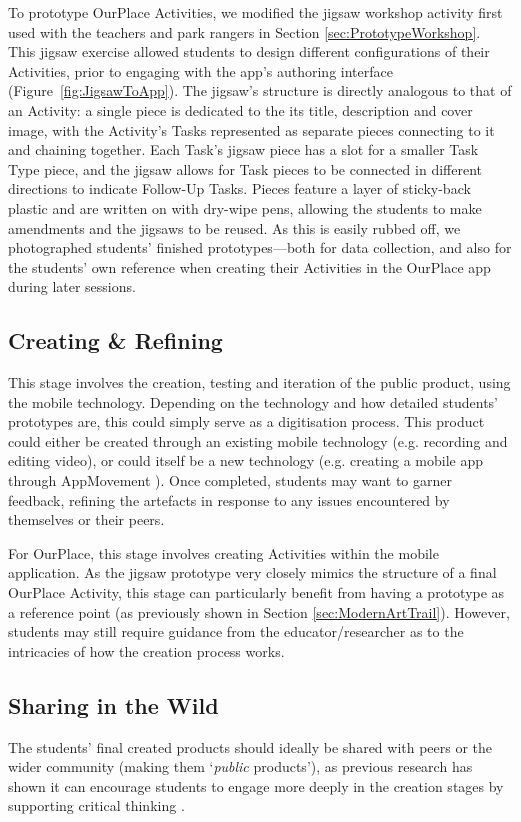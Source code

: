 To prototype OurPlace Activities, we modified the jigsaw workshop activity first used with the teachers and park rangers in Section \ref{sec:PrototypeWorkshop}. This jigsaw exercise allowed students to design different configurations of their Activities, prior to engaging with the app's authoring interface (Figure~\ref{fig:JigsawToApp}). The jigsaw's structure is directly analogous to that of an Activity: a single piece is dedicated to the its title, description and cover image, with the Activity's Tasks represented as separate pieces connecting to it and chaining together. Each Task's jigsaw piece has a slot for a smaller Task Type piece, and the jigsaw allows for Task pieces to be connected in different directions to indicate Follow-Up Tasks. Pieces feature a layer of sticky-back plastic and are written on with dry-wipe pens, allowing the students to make amendments and the jigsaws to be reused. As this is easily rubbed off, we photographed students' finished prototypes---both for data collection, and also for the students' own reference when creating their Activities in the OurPlace app during later sessions.

\subsection{Creating \& Refining}
This stage involves the creation, testing and iteration of the public product, using the mobile technology. Depending on the technology and how detailed students' prototypes are, this could simply serve as a digitisation process. This product could either be created through an existing mobile technology (e.g. recording and editing video), or could itself be a new technology (e.g. creating a mobile app through AppMovement \citep{Garbett2016}). Once completed, students may want to garner feedback, refining the artefacts in response to any issues encountered by themselves or their peers. 

For OurPlace, this stage involves creating Activities within the mobile application. As the jigsaw prototype very closely mimics the structure of a final OurPlace Activity, this stage can particularly benefit from having a prototype as a reference point (as previously shown in Section \ref{sec:ModernArtTrail}). However, students may still require guidance from the educator/researcher as to the intricacies of how the creation process works.

\subsection{Sharing in the Wild}
The students' final created products should ideally be shared with peers or the wider community (making them `\textit{public} products'), as previous research has shown it can encourage students to engage more deeply in the creation stages by supporting critical thinking \citep{Sarangapani2018}. 

